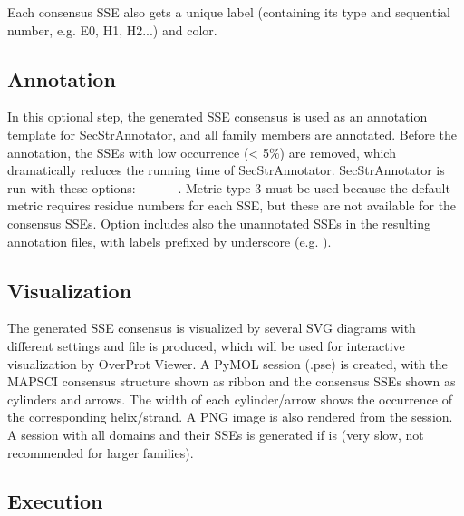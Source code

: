 \documentclass{article}
\begin{document}
Each consensus SSE also gets a unique label (containing its type and sequential number, e.g. E0, H1, H2...) and color.

\subsection{Annotation}

In this optional step, the generated SSE consensus is used
as an annotation template for SecStrAnnotator, and all family members are
annotated. Before the annotation, the SSEs with low occurrence
(\textless{} 5\%) are removed, which dramatically reduces the running
time of SecStrAnnotator. SecStrAnnotator is run with these options:
 ~
~ ~
~. 
Metric type 3 must be used because the default metric requires 
residue numbers for each SSE, but these are not available for the consensus SSEs. 
Option  includes also the unannotated SSEs in the resulting annotation files, 
with labels prefixed by underscore (e.g. ).



\subsection{Visualization}

The generated SSE consensus is visualized by several SVG diagrams with
different settings and  file is produced, which
will be used for interactive visualization by OverProt Viewer. 
A PyMOL session (.pse) is created, with the MAPSCI consensus structure 
shown as ribbon and the consensus SSEs shown as cylinders and arrows.
The width of each cylinder/arrow shows the occurrence of the corresponding helix/strand.
A PNG image is also rendered from the session. 
A session with all domains and their SSEs is
generated if  is
 (very slow, not recommended for larger families).



\subsection{Execution}
\end{document}
